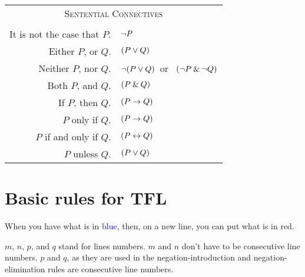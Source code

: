 \begin{center}
\label{app.symbolization}
\begin{tabular*}{\textwidth}{rl}
\multicolumn{2}{c}{\textsc{Sentential Connectives}}\\ \\
It is not the case that $P$. & ${\neg} P$\\
Either $P$, or $Q$. & $(P \vee Q)$\\
Neither $P$, nor $Q$. & ${\neg}(P \vee Q)$\ or \ $({\neg} P \mathbin{\&} {\neg} Q)$\\
Both $P$, and $Q$. & $(P \mathbin{\&} Q)$\\
If $P$, then $Q$. & $(P \rightarrow Q)$\\
$P$ only if $Q$. & $(P \rightarrow Q)$\\
$P$ if and only if $Q$. & $(P \leftrightarrow Q)$\\
$P$ unless $Q$. & $(P \vee Q)$\\
\end{tabular*}
\end{center}




\newpage


\section{Basic rules for TFL}\label{ProofRules}

When you have what is in \textcolor{blue}{blue}, then, on a new line, you can put what is in \textcolor{red2}{red}. 

\noindent$m$, $n$, $p$, and $q$ stand for lines numbers. $m$ and $n$ don't have to be consecutive line numbers. $p$ and $q$, as they are used in the negation-introduction and negation-elimination rules are consecutive line numbers.


